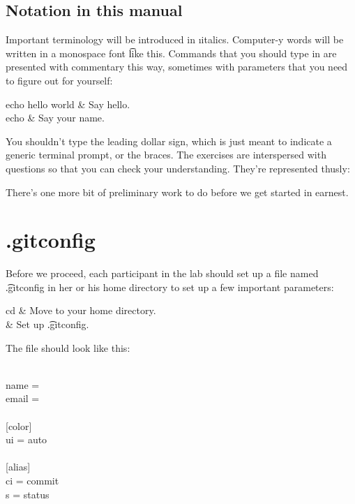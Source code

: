 \documentclass[letterpaper,12pt,titlepage,twoside]{article}
\begin{document}
\subsection*{Notation in this manual}

Important terminology will be introduced in \i{italics}. Computer-y words will
be written in a monospace font \t{like this}. Commands that you should type in
are presented with commentary this way, sometimes with parameters that you
need to figure out for yourself:

\begin{typeme}
echo hello world & Say hello. \\
echo  & Say your name.
\end{typeme}

You shouldn't type the leading dollar sign, which is just meant to indicate a
generic terminal prompt, or the braces. The exercises are interspersed with
questions so that you can check your understanding. They're represented
thusly:


There's one more bit of preliminary work to do before we get started in
earnest.


\section{.gitconfig}

Before we proceed, each participant in the lab should set up a file named
\t{.gitconfig} in her or his home directory to set up a few important
parameters:

\begin{typeme}
cd & Move to your home directory. \\
 & Set up \t{.gitconfig}.
\end{typeme}

The file should look like this:

\begin{adjustwidth}{2.5em}{0pt}
\ttfamily
[user]\\
name = \\
email = \\
\\{}
[color]\\
ui = auto\\
\\{}
[alias]\\
ci = commit\\
s = status
\end{adjustwidth}
\end{document}
